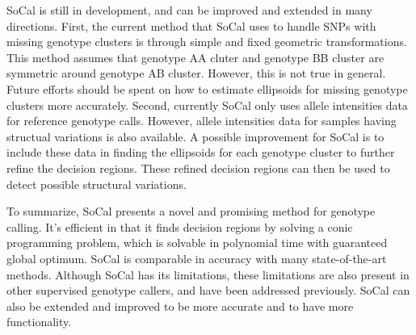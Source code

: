\documentclass{scrartcl}
\begin{document}
\par
SoCal is still in development, and can be improved and extended in
many directions.
First, the current method that SoCal uses to handle SNPs with missing genotype
clusters is through simple and fixed geometric transformations.
This method assumes that genotype AA cluter and genotype BB cluster are
symmetric around genotype AB cluster.
However, this is not true in general.
Future efforts should be spent on how to estimate ellipsoids for missing
genotype clusters more accurately.
Second, currently SoCal only uses allele intensities data for reference
genotype calls.
However, allele intensities data for samples having structual variations is
also available.
A possible improvement for SoCal is to include these data in finding the
ellipsoids for each genotype cluster to further refine the decision regions.
These refined decision regions can then be used to detect possible structural
variations.

\par
To summarize, SoCal presents a novel and promising method for genotype calling.
It's efficient in that it finds decision regions by solving a conic
programming problem, which is solvable in polynomial time with guaranteed
global optimum.
SoCal is comparable in accuracy with many state-of-the-art methods.
Although SoCal has its limitations, these limitations are also present in other
supervised genotype callers, and have been addressed previously.
SoCal can also be extended and improved to be more accurate and to have more
functionality.
\end{document}
